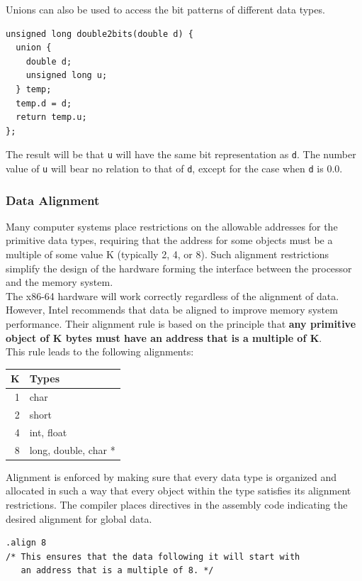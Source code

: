 \documentclass[11pt]{article}
\begin{document}
Unions can also be used to access the bit patterns of different data types.\\
\begin{verbatim}
unsigned long double2bits(double d) {
  union {
    double d;
    unsigned long u;
  } temp;
  temp.d = d;
  return temp.u;
};
\end{verbatim}
The result will be that \texttt{u} will have the same bit representation as \texttt{d}. The number value of \texttt{u} will bear no relation to that of \texttt{d}, except for the case when \texttt{d} is 0.0.\\

\subsubsection{Data Alignment}
\label{sec:orgfc06c41}
Many computer systems place restrictions on the allowable addresses for the primitive data types, requiring that the address for some objects must be a multiple of some value K (typically 2, 4, or 8). Such alignment restrictions simplify the design of the hardware forming the interface between the processor and the memory system.\\

The x86-64 hardware will work correctly regardless of the alignment of data. However, Intel recommends that data be aligned to improve memory system performance. Their alignment rule is based on the principle that \textbf{any primitive object of K bytes must have an address that is a multiple of K}.\\

This rule leads to the following alignments:\\
\begin{center}
\begin{tabular}{rl}
K & Types\\
\hline
1 & char\\
2 & short\\
4 & int, float\\
8 & long, double, char *\\
\end{tabular}
\end{center}

Alignment is enforced by making sure that every data type is organized and allocated in such a way that every object within the type satisfies its alignment restrictions. The compiler places directives in the assembly code indicating the desired alignment for global data.\\
\begin{verbatim}
.align 8  
/* This ensures that the data following it will start with
   an address that is a multiple of 8. */
\end{verbatim}
\end{document}
